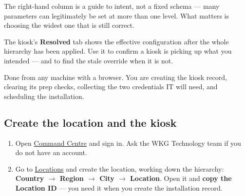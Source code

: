 \documentclass[a4paper,10pt]{article}
\begin{document}
The right-hand column is a guide to intent, not a fixed schema --- many
parameters can legitimately be set at more than one level. What matters is
choosing the widest one that is still correct.

\begin{wkinfo}
The kiosk's \textbf{Resolved} tab shows the effective configuration after
the whole hierarchy has been applied. Use it to confirm a kiosk is picking
up what you intended --- and to find the stale override when it is not.
\end{wkinfo}


Done from any machine with a browser. You are creating the kiosk record,
clearing its prep checks, collecting the two credentials IT will need, and
scheduling the installation.

\subsection{Create the location and the kiosk}

\begin{enumerate}
  \item Open \href{https://command.weknow.technology}{Command Centre}
        and sign in. Ask the WKG Technology team if you do not have an
        account.

  \item Go to \href{https://command.weknow.technology/locations}{Locations}
        and create the location, working down the hierarchy:
        \textbf{Country $\rightarrow$ Region $\rightarrow$ City
        $\rightarrow$ Location}. Open it and \textbf{copy the Location
        ID} --- you need it when you create the installation record.
\end{enumerate}

\end{document}
